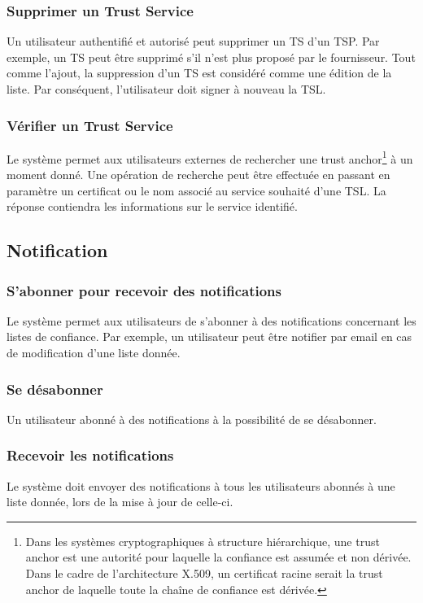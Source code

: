 \documentclass{tnreport}
\begin{document}
\subsubsection{Supprimer un Trust Service}
Un utilisateur authentifié et autorisé peut supprimer un TS d'un TSP. Par exemple, un TS peut être supprimé s'il n'est plus proposé par le fournisseur. Tout comme l'ajout, la suppression d'un TS est considéré comme une édition de la liste. Par conséquent, l'utilisateur doit signer à nouveau la TSL.
\subsubsection{Vérifier un Trust Service}
Le système permet aux utilisateurs externes de rechercher une 
trust anchor\footnote{Dans les systèmes cryptographiques à structure hiérarchique, une trust anchor est une autorité pour laquelle la confiance est assumée et non dérivée. Dans le cadre de l'architecture X.509, un certificat racine serait la trust anchor de laquelle toute la chaîne de confiance est dérivée.} 
à un moment donné. 
Une opération de recherche peut être effectuée en passant en paramètre un certificat ou le nom associé au service souhaité d'une TSL. La réponse contiendra les informations sur le service identifié.

\subsection{Notification}
\label{sec:notification}
\subsubsection{S'abonner pour recevoir des notifications}
Le système permet aux utilisateurs de s'abonner à des notifications concernant les listes de confiance. Par exemple, un utilisateur peut être notifier par email en cas de modification d'une liste donnée.
\subsubsection{Se désabonner}
Un utilisateur abonné à des notifications à la possibilité de se désabonner.
\subsubsection{Recevoir les notifications}
Le système doit envoyer des notifications à tous les utilisateurs abonnés à une liste donnée, lors de la mise à jour de celle-ci.
\end{document}
